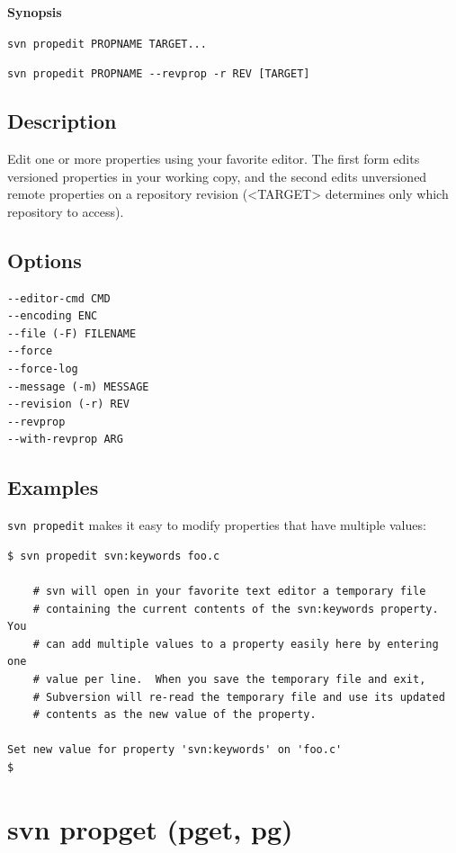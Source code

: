 \textbf{Synopsis}

\texttt{svn\ propedit\ PROPNAME\ TARGET...}

\texttt{svn\ propedit\ PROPNAME\ -\/-revprop\ -r\ REV\ {[}TARGET{]}}

\subsection{Description}

Edit one or more properties using your favorite editor. The first form
edits versioned properties in your working copy, and the second edits
unversioned remote properties on a repository revision
(\textless TARGET\textgreater{} determines only which repository to
access).

\subsection{Options}

\begin{verbatim}
--editor-cmd CMD
--encoding ENC
--file (-F) FILENAME
--force
--force-log
--message (-m) MESSAGE
--revision (-r) REV
--revprop
--with-revprop ARG
\end{verbatim}

\subsection{Examples}

\texttt{svn\ propedit} makes it easy to modify properties that have
multiple values:

\begin{verbatim}
$ svn propedit svn:keywords foo.c 

    # svn will open in your favorite text editor a temporary file
    # containing the current contents of the svn:keywords property.  You
    # can add multiple values to a property easily here by entering one
    # value per line.  When you save the temporary file and exit,
    # Subversion will re-read the temporary file and use its updated
    # contents as the new value of the property.

Set new value for property 'svn:keywords' on 'foo.c'
$
\end{verbatim}

\section{svn propget (pget, pg)}\label{svn.ref.svn.c.propget}

